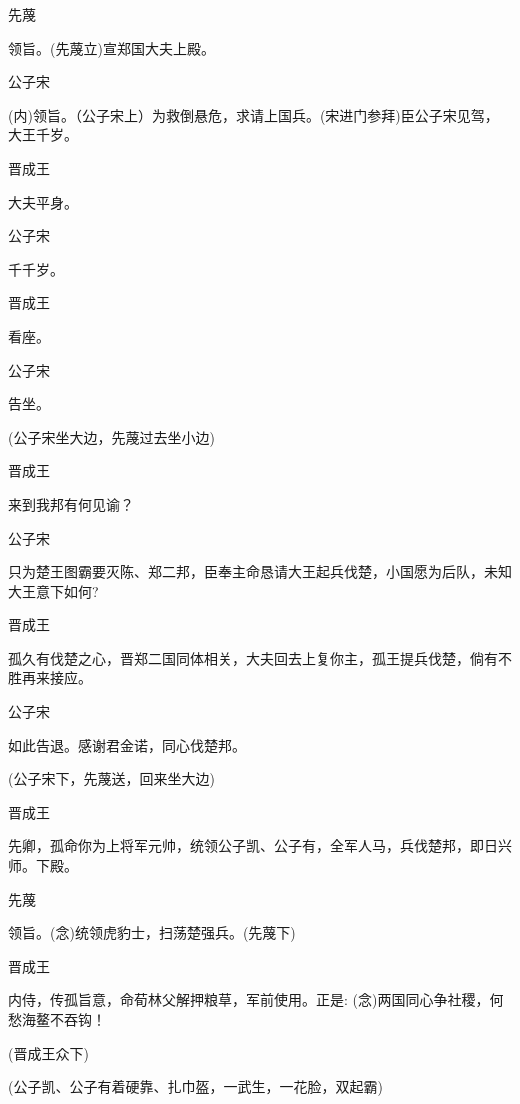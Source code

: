 {先蔑\hspace{30pt}~

领旨。(先蔑立)宣郑国大夫上殿。

公子宋

({\akai 内})领旨。（公子宋上）为救倒悬危，求请上国兵。(宋进门参拜)臣公子宋见驾，大王千岁。

晋成王\hspace{20pt}~

大夫平身。

公子宋\hspace{20pt}~

千千岁。

晋成王\hspace{20pt}~

看座。

公子宋\hspace{20pt}~

告坐。

(公子宋坐大边，先蔑过去坐小边)

晋成王\hspace{20pt}~

来到我邦有何见谕？

公子宋

只为楚王图霸要灭陈、郑二邦，臣奉主命恳请大王起兵伐楚，小国愿为后队，未知大王意下如何?

晋成王

孤久有伐楚之心，晋郑二国同体相关，大夫回去上复你主，孤王提兵伐楚，倘有不胜再来接应。

公子宋\hspace{20pt}~

如此告退。感谢君金诺，同心伐楚邦。

(公子宋下，先蔑送，回来坐大边)

晋成王

先卿，孤命你为上将军元帅，统领公子凯、公子有，全军人马，兵伐楚邦，即日兴师。下殿。

先蔑\hspace{30pt}~

领旨。({\akai 念})统领虎豹士，扫荡楚强兵。(先蔑下)

晋成王

内侍，传孤旨意，命荀林父解押粮草，军前使用。正是: ({\akai 念})两国同心争社稷，何愁海鳌不吞钩！

(晋成王众下)

\vspace{5pt}

(公子凯、公子有着硬靠、扎巾盔，一武生，一花脸，双起霸)

}
